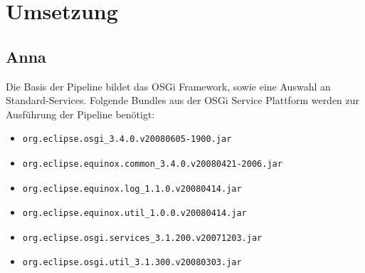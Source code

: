 \chapter{Umsetzung}
\section{Anna}
Die Basis der Pipeline bildet das OSGi Framework, sowie
eine Auswahl an Standard-Services.
Folgende Bundles aus der OSGi Service Plattform werden zur Ausführung der
Pipeline benötigt:
\begin{itemize}
  \item
  \begin{verbatim}org.eclipse.osgi_3.4.0.v20080605-1900.jar\end{verbatim}
  \item
  \begin{verbatim}org.eclipse.equinox.common_3.4.0.v20080421-2006.jar\end{verbatim}
  \item
  \begin{verbatim}org.eclipse.equinox.log_1.1.0.v20080414.jar\end{verbatim}
  \item
  \begin{verbatim}org.eclipse.equinox.util_1.0.0.v20080414.jar\end{verbatim}
  \item
  \begin{verbatim}org.eclipse.osgi.services_3.1.200.v20071203.jar\end{verbatim}
  \item
  \begin{verbatim}org.eclipse.osgi.util_3.1.300.v20080303.jar\end{verbatim}
\end{itemize}

